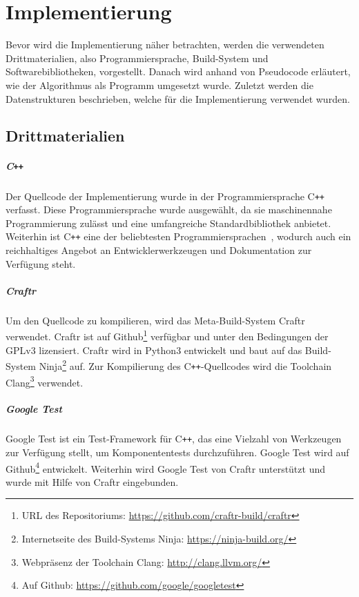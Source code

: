 \newcommand{\Cpp}{C{}\texttt{++}}

\chapter{Implementierung}\label{chapter:implementierung}
Bevor wird die Implementierung näher betrachten, werden die verwendeten Drittmaterialien, also Programmiersprache, Build-System und Softwarebibliotheken, vorgestellt.
Danach wird anhand von Pseudocode erläutert, wie der Algorithmus als Programm umgesetzt wurde. 
Zuletzt werden die Datenstrukturen beschrieben, welche für die Implementierung verwendet wurden.

\section{Drittmaterialien}

\paragraph{\Cpp}
Der Quellcode der Implementierung wurde in der Programmiersprache \Cpp{} verfasst.
Diese Programmiersprache wurde ausgewählt, da sie maschinennahe Programmierung zulässt und eine umfangreiche Standardbibliothek anbietet.
Weiterhin ist \Cpp{} eine der beliebtesten Programmiersprachen~\parencite{TIO17}, wodurch auch ein reichhaltiges Angebot an Entwicklerwerkzeugen und Dokumentation zur Verfügung steht.

\paragraph{Craftr}
Um den Quellcode zu kompilieren, wird das Meta-Build-System Craftr verwendet.
Craftr ist auf Github\footnote{URL des Repositoriums: \url{https://github.com/craftr-build/craftr}} verfügbar und unter den Bedingungen der GPLv3 lizensiert.
Craftr wird in Python3 entwickelt und baut auf das Build-System Ninja\footnote{Internetseite des Build-Systems Ninja: \url{https://ninja-build.org/}} auf. 
Zur Kompilierung des \Cpp\hyp Quellcodes wird die Toolchain Clang\footnote{Webpräsenz der Toolchain Clang: \url{http://clang.llvm.org/}} verwendet.

\paragraph{Google Test}
Google Test ist ein Test-Framework für \Cpp, das eine Vielzahl von Werkzeugen zur Verfügung stellt, um Komponententests durchzuführen. 
Google Test wird auf Github\footnote{Auf Github: \url{https://github.com/google/googletest}} entwickelt.
Weiterhin wird Google Test von Craftr unterstützt und wurde mit Hilfe von Craftr eingebunden.

